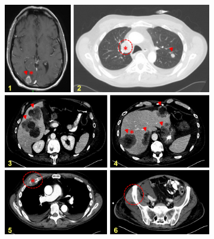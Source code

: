 \begin{figure}[htbp]
	\centering
	\begin{subfigure}{0.72\textwidth}
		\includegraphics[width=\textwidth,keepaspectratio]{images/303/ct}
		\caption{}\label{fig:303:ct}
	\end{subfigure}%
	\hfill%
	\begin{subfigure}{0.235\textwidth}

\end{subfigure}
\end{figure}
